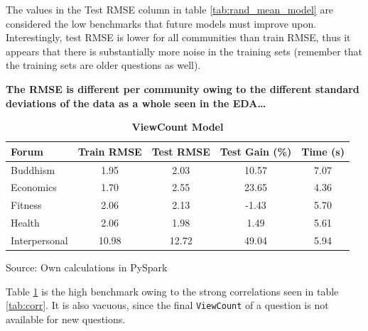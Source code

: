 \documentclass[11pt,preprint, authoryear]{article}
\numberwithin{equation}{section}
\begin{document}
\normalsize

The values in the Test RMSE column in table \ref{tab:rand_mean_model}
are considered the low benchmarks that future models must improve upon.
Interestingly, test RMSE is lower for all communities than train RMSE,
thus it appears that there is substantially more noise in the training
sets (remember that the training sets are older questions as well).

\textbf{The RMSE is different per community owing to the different
standard deviations of the data as a whole seen in the EDA\ldots{}}

\footnotesize

\begin{longtable}[htbp] {@{} lcccc @{}} 
\caption{\textbf{ViewCount Model}} 
\label{tab:rand_view_model} \\
\toprule
\textbf{Forum} &  \textbf{Train RMSE} &  \textbf{Test RMSE} &  \textbf{Test Gain (\%)} &  \textbf{Time (s)} \\
\midrule
Buddhism      &                 1.95 &              2.03 &              10.57 &               7.07 \\
Economics     &                 1.70 &              2.55 &              23.65 &               4.36 \\
Fitness       &                 2.06 &              2.13 &              -1.43 &               5.70 \\
Health        &                 2.06 &              1.98 &               1.49 &               5.61 \\
Interpersonal &                10.98 &             12.72 &              49.04 &               5.94 \\
\bottomrule
\end{longtable}\begin{center} Source: Own calculations in PySpark\end{center}

\normalsize

Table \ref{tab:rand_view_model} is the high benchmark owing to the
strong correlations seen in table \ref{tab:corr}. It is also vacuous,
since the final \texttt{ViewCount} of a question is not available for
new questions.

\footnotesize
\end{document}
